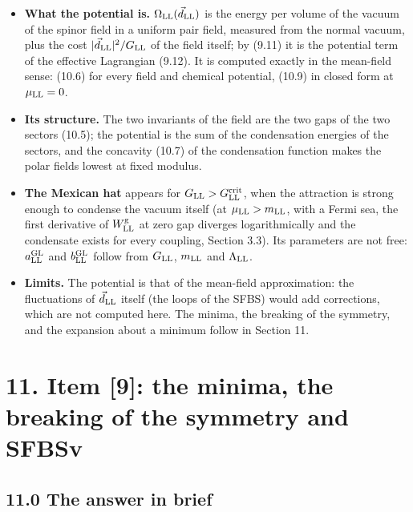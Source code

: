 \documentclass[
  10pt,
]{article}
\providecommand{\tightlist}{%
  \setlength{\itemsep}{0pt}\setlength{\parskip}{0pt}}
\begin{document}
\begin{itemize}
\tightlist
\item
  \textbf{What the potential is.} \(\Omega_{\rm LL}(\vec d_{\rm LL})\)
  is the energy per volume of the vacuum of the spinor field in a
  uniform pair field, measured from the normal vacuum, plus the cost
  \(\lvert\vec d_{\rm LL}\rvert^2/G_{\rm LL}\) of the field itself; by
  (9.11) it is the potential term of the effective Lagrangian (9.12). It
  is computed exactly in the mean-field sense: (10.6) for every field
  and chemical potential, (10.9) in closed form at \(\mu_{\rm LL}=0\).
\item
  \textbf{Its structure.} The two invariants of the field are the two
  gaps of the two sectors (10.5); the potential is the sum of the
  condensation energies of the sectors, and the concavity (10.7) of the
  condensation function makes the polar fields lowest at fixed modulus.
\item
  \textbf{The Mexican hat} appears for
  \(G_{\rm LL}>G^{\rm crit}_{\rm LL}\), when the attraction is strong
  enough to condense the vacuum itself (at \(\mu_{\rm LL}>m_{\rm LL}\),
  with a Fermi sea, the first derivative of \(W^{\rm g}_{\rm LL}\) at
  zero gap diverges logarithmically and the condensate exists for every
  coupling, Section 3.3). Its parameters are not free:
  \(a^{\rm GL}_{\rm LL}\) and \(b^{\rm GL}_{\rm LL}\) follow from
  \(G_{\rm LL}\), \(m_{\rm LL}\) and \(\Lambda_{\rm LL}\).
\item
  \textbf{Limits.} The potential is that of the mean-field
  approximation: the fluctuations of \(\vec d_{\rm LL}\) itself (the
  loops of the SFBS) would add corrections, which are not computed here.
  The minima, the breaking of the symmetry, and the expansion about a
  minimum follow in Section 11.
\end{itemize}

\hypertarget{item-9-the-minima-the-breaking-of-the-symmetry-and-sfbsv}{%
\section{11. Item {[}9{]}: the minima, the breaking of the symmetry and
SFBSv}\label{item-9-the-minima-the-breaking-of-the-symmetry-and-sfbsv}}

\hypertarget{the-answer-in-brief-9}{%
\subsection{11.0 The answer in brief}\label{the-answer-in-brief-9}}
\end{document}
